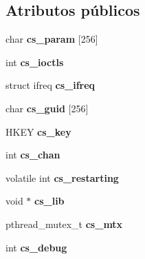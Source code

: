 \subsection*{Atributos públicos}
\begin{DoxyCompactItemize}
\item 
\hypertarget{structcstate_a30472fdc1772fc0e234abfc280063553}{
char {\bfseries cs\_\-param} \mbox{[}256\mbox{]}}
\label{structcstate_a30472fdc1772fc0e234abfc280063553}

\item 
\hypertarget{structcstate_a15c6066c353e391e28b90bf9eb6f4f62}{
int {\bfseries cs\_\-ioctls}}
\label{structcstate_a15c6066c353e391e28b90bf9eb6f4f62}

\item 
\hypertarget{structcstate_a2e26d5c45d6ccac0c92aaddb90b0997c}{
struct ifreq {\bfseries cs\_\-ifreq}}
\label{structcstate_a2e26d5c45d6ccac0c92aaddb90b0997c}

\item 
\hypertarget{structcstate_a11905cc22a23e797169071d1de6680b5}{
char {\bfseries cs\_\-guid} \mbox{[}256\mbox{]}}
\label{structcstate_a11905cc22a23e797169071d1de6680b5}

\item 
\hypertarget{structcstate_afdb54f97cb7adb88ecc7bae88713f1cf}{
HKEY {\bfseries cs\_\-key}}
\label{structcstate_afdb54f97cb7adb88ecc7bae88713f1cf}

\item 
\hypertarget{structcstate_a76c5a552c3a78a157f59dc414aec0924}{
int {\bfseries cs\_\-chan}}
\label{structcstate_a76c5a552c3a78a157f59dc414aec0924}

\item 
\hypertarget{structcstate_aaee385f31f5541e4494c056cb13dbfca}{
volatile int {\bfseries cs\_\-restarting}}
\label{structcstate_aaee385f31f5541e4494c056cb13dbfca}

\item 
\hypertarget{structcstate_a107a6049e73bf8d72ef5cd925c6dbd50}{
void $\ast$ {\bfseries cs\_\-lib}}
\label{structcstate_a107a6049e73bf8d72ef5cd925c6dbd50}

\item 
\hypertarget{structcstate_a439c7ad11cbd4a2629536df1fa6f5ece}{
pthread\_\-mutex\_\-t {\bfseries cs\_\-mtx}}
\label{structcstate_a439c7ad11cbd4a2629536df1fa6f5ece}

\item 
\hypertarget{structcstate_a8082bdb47364d1b60263a2b4512cb9ed}{
int {\bfseries cs\_\-debug}}
\label{structcstate_a8082bdb47364d1b60263a2b4512cb9ed}


\end{DoxyCompactItemize}
